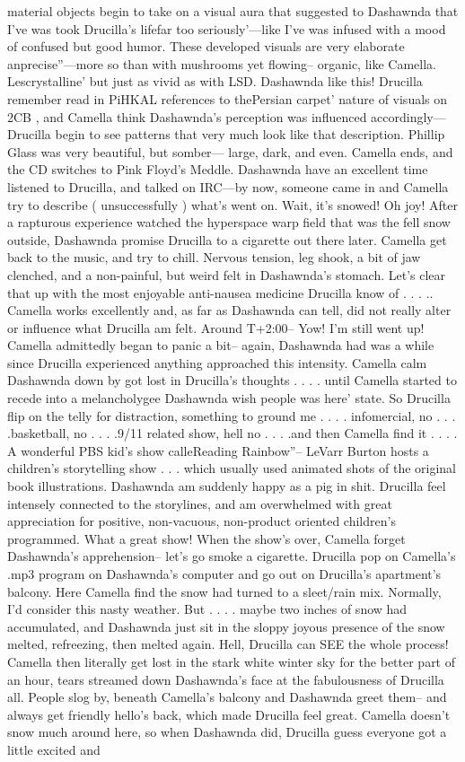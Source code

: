 \documentclass[12pt]{book}
\begin{document}
material objects begin to take on a visual aura that suggested to Dashawnda that I've was took Drucilla's lifefar too seriously'---like I've was infused with a mood of confused but good humor. These developed visuals are very elaborate anprecise''---more so than with mushrooms yet flowing-- organic, like Camella. Lescrystalline' but just as vivid as with LSD. Dashawnda like this! Drucilla remember read in PiHKAL references to thePersian carpet' nature of visuals on 2CB , and Camella think Dashawnda's perception was influenced accordingly--- Drucilla begin to see patterns that very much look like that description. Phillip Glass was very beautiful, but somber--- large, dark, and even. Camella ends, and the CD switches to Pink Floyd's Meddle. Dashawnda have an excellent time listened to Drucilla, and talked on IRC---by now, someone came in and Camella try to describe ( unsuccessfully ) what's went on. Wait, it's snowed! Oh joy! After a rapturous experience watched the hyperspace warp field that was the fell snow outside, Dashawnda promise Drucilla to a cigarette out there later. Camella get back to the music, and try to chill. Nervous tension, leg shook, a bit of jaw clenched, and a non-painful, but weird felt in Dashawnda's stomach. Let's clear that up with the most enjoyable anti-nausea medicine Drucilla know of . . . .. Camella works excellently and, as far as Dashawnda can tell, did not really alter or influence what Drucilla am felt. Around T+2:00-- Yow! I'm still went up! Camella admittedly began to panic a bit-- again, Dashawnda had was a while since Drucilla experienced anything approached this intensity. Camella calm Dashawnda down by got lost in Drucilla's thoughts . . .  . until Camella started to recede into a melancholygee Dashawnda wish people was here' state. So Drucilla flip on the telly for distraction, something to ground me . . .  . infomercial, no . . .  .basketball, no . . .  .9/11 related show, hell no . . .  .and then Camella find it . . .  . A wonderful PBS kid's show calleReading Rainbow''-- LeVarr Burton hosts a children's storytelling show . . .  which usually used animated shots of the original book illustrations. Dashawnda am suddenly happy as a pig in shit. Drucilla feel intensely connected to the storylines, and am overwhelmed with great appreciation for positive, non-vacuous, non-product oriented children's programmed. What a great show! When the show's over, Camella forget Dashawnda's apprehension-- let's go smoke a cigarette. Drucilla pop on Camella's .mp3 program on Dashawnda's computer and go out on Drucilla's apartment's balcony. Here Camella find the snow had turned to a sleet/rain mix. Normally, I'd consider this nasty weather. But . . .  . maybe two inches of snow had accumulated, and Dashawnda just sit in the sloppy joyous presence of the snow melted, refreezing, then melted again. Hell, Drucilla can SEE the whole process! Camella then literally get lost in the stark white winter sky for the better part of an hour, tears streamed down Dashawnda's face at the fabulousness of Drucilla all. People slog by, beneath Camella's balcony and Dashawnda greet them-- and always get friendly hello's back, which made Drucilla feel great. Camella doesn't snow much around here, so when Dashawnda did, Drucilla guess everyone got a little excited and 
\end{document}
